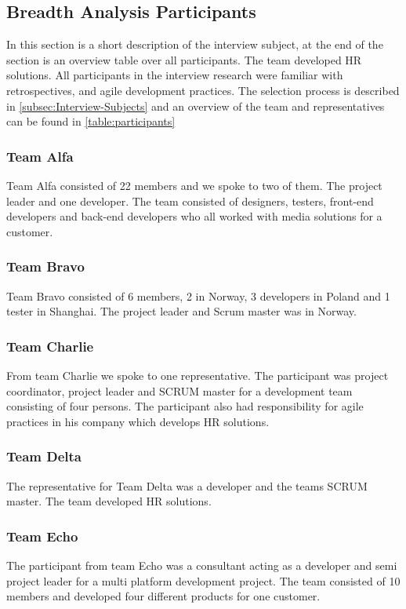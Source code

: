 \subsection{Breadth Analysis Participants}
In this section is a short description of the interview subject, at the end of the section is an overview table over all participants. The team developed HR solutions. All participants in the interview research were familiar with retrospectives, and agile development practices. The selection process is described in \autoref{subsec:Interview-Subjects} and an overview of the team and representatives can be found in \autoref{table:participants}

\subsubsection{Team Alfa}
Team Alfa consisted of 22 members and we spoke to two of them. The project leader and one developer. The team consisted of designers, testers, front-end developers and back-end developers who all worked with media solutions for a customer. 

\subsubsection{Team Bravo}
Team Bravo consisted of 6 members, 2 in Norway, 3 developers in Poland and 1 tester in Shanghai. The project leader and  Scrum master was in Norway. 

\subsubsection{Team Charlie}
From team Charlie we spoke to one representative. The participant was project coordinator, project leader and SCRUM master for a development team consisting of four persons. The participant also had responsibility for agile practices in his company which develops HR solutions. 

\subsubsection{Team Delta}
The representative for Team Delta was a developer and the teams SCRUM master. The team developed HR solutions. 

\subsubsection{Team Echo}
The participant from team Echo was a consultant acting as a developer and semi project leader for a multi platform development project. The team consisted of 10 members and developed four different products for one customer.


